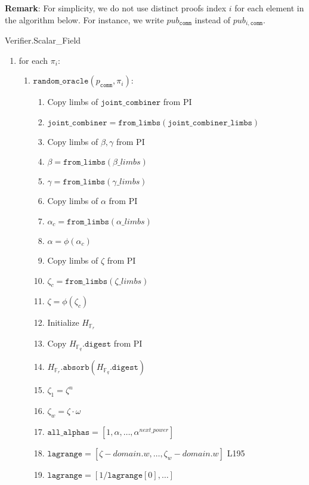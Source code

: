 \textbf{Remark}: For simplicity, we do not use distinct proofs index $i$ for each element in the algorithm below.
For instance, we write $pub_{\texttt{comm}}$ instead of $pub_{i, \texttt{comm}}$.

\begin{algorithm}[H]
\caption{Verifier.Scalar\_Field}
\begin{enumerate}
	\item for each $\pi_i$:
		\begin{enumerate}
			\item $\texttt{random\_oracle}(p_{\texttt{comm}}, \pi_i)$:
            \begin{enumerate}
				\item Copy limbs of $\texttt{joint\_combiner}$ from PI
				\item $\texttt{joint\_combiner} = \texttt{from\_limbs}(\texttt{joint\_combiner\_limbs})$
				\item Copy limbs of $\beta, \gamma$ from PI
                \item $\beta = \texttt{from\_limbs}(\beta\_limbs)$
                \item $ \gamma = \texttt{from\_limbs}(\gamma\_limbs)$
				\item Copy limbs of $\alpha$ from PI
				\item $ \alpha_{c} = \texttt{from\_limbs}(\alpha\_limbs)$
                \item $\alpha = \phi(\alpha_c)$
				\item Copy limbs of $\zeta$ from PI
				\item $ \zeta_{c} = \texttt{from\_limbs}(\zeta\_limbs)$
                \item $\zeta = \phi(\zeta_c)$
                \item Initialize $H_{\mathbb{F}_r}$
                \item Copy $H_{\mathbb{F}_q}.\texttt{digest}$ from PI
                \item $H_{\mathbb{F}_r}.\texttt{absorb}(H_{\mathbb{F}_q}.\texttt{digest})$
                \item $\zeta_1 = \zeta^{n}$
                \item $\zeta_w = \zeta \cdot \omega$
				\item $\texttt{all\_alphas} = [1, \alpha, \dots, \alpha^{next\_power}]$
				\item $\texttt{lagrange} = [\zeta - domain.w, \dots, \zeta_w - domain.w]$ L195
				\item $\texttt{lagrange} = [1 / \texttt{lagrange}[0], \dots]$

\end{enumerate}
\end{enumerate}
\end{enumerate}
\end{algorithm}
